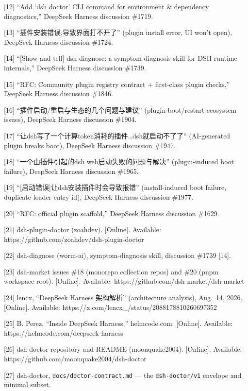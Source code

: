 \documentclass[
]{article}
\begin{document}
{[}12{]} ``Add `dsh doctor' CLI command for environment \& dependency
diagnostics,'' DeepSeek Harness discussion \#1719.

{[}13{]} ``插件安装错误,导致界面打不开了'' (plugin install error, UI
won't open), DeepSeek Harness discussion \#1724.

{[}14{]} ``{[}Show and tell{]} dsh-diagnose: a symptom-diagnosis skill
for DSH runtime internals,'' DeepSeek Harness discussion \#1739.

{[}15{]} ``RFC: Community plugin registry contract + first-class plugin
checks,'' DeepSeek Harness discussion \#1846.

{[}16{]} ``插件启动/重启与生态的几个问题与建议'' (plugin boot/restart
ecosystem issues), DeepSeek Harness discussion \#1904.

{[}17{]} ``让dsh写了一个计算token消耗的插件\ldots dsh就启动不了了''
(AI-generated plugin breaks boot), DeepSeek Harness discussion \#1947.

{[}18{]} ``一个由插件引起的dsh web启动失败的问题与解决'' (plugin-induced
boot failure), DeepSeek Harness discussion \#1965.

{[}19{]} ``{[}启动错误{]}让dsh安装插件时会导致报错'' (install-induced
boot failure, duplicate loader entry id), DeepSeek Harness discussion
\#1977.

{[}20{]} ``RFC: official plugin scaffold,'' DeepSeek Harness discussion
\#1629.

{[}21{]} dsh-plugin-doctor (zoahdev). {[}Online{]}. Available:
https://github.com/zoahdev/dsh-plugin-doctor

{[}22{]} dsh-diagnose (worm-ai), symptom-diagnosis skill, discussion
\#1739 {[}14{]}.

{[}23{]} dsh-market issues \#18 (monorepo collection repos) and \#20
(pnpm workspace-root). {[}Online{]}. Available:
https://github.com/dsh-market/dsh-market

{[}24{]} lencx, ``DeepSeek Harness 架构解析'' (architecture analysis),
Aug.~14, 2026. {[}Online{]}. Available:
https://x.com/lencx\_/status/2088178810260697352

{[}25{]} B. Perez, ``Inside DeepSeek Harness,'' helmcode.com.
{[}Online{]}. Available: https://helmcode.com/deepseek-harness

{[}26{]} dsh-doctor repository and README (moonquake2004). {[}Online{]}.
Available: https://github.com/moonquake2004/dsh-doctor

{[}27{]} dsh-doctor, \texttt{docs/doctor-contract.md} --- the
\texttt{dsh-doctor/v1} envelope and minimal subset.
\end{document}

